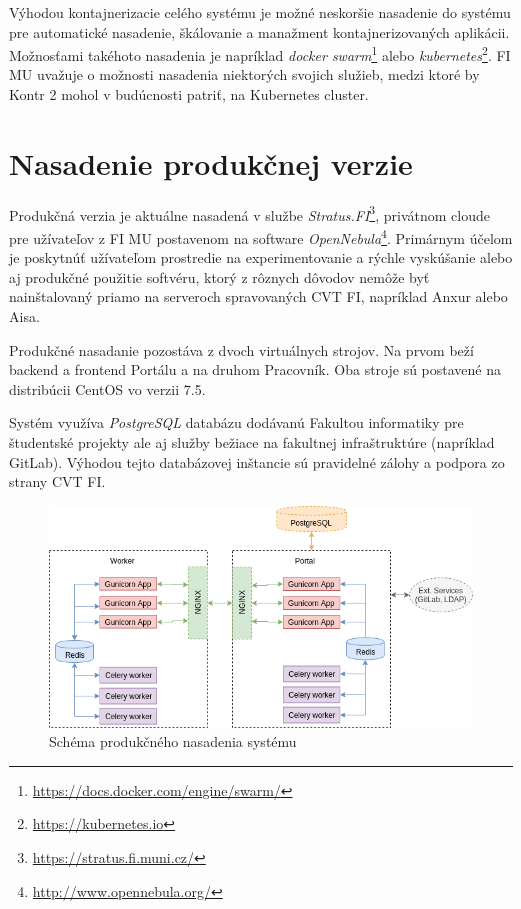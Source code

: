 \documentclass[
  digital, %
  oneside, %
  table,   %
  lof,     %
  lot,   %
]{fithesis3}
\begin{document}
Výhodou kontajnerizacie celého systému je možné neskoršie nasadenie do systému pre automatické nasadenie, škálovanie a manažment kontajnerizovaných aplikácii. Možnosťami takéhoto nasadenia je napríklad \emph{docker swarm}\footnote{\url{https://docs.docker.com/engine/swarm/}} alebo \emph{kubernetes}\footnote{\url{https://kubernetes.io}}. FI MU uvažuje o možnosti nasadenia niektorých svojich služieb, medzi ktoré by Kontr 2 mohol v budúcnosti patriť, na Kubernetes cluster. 

\section{Nasadenie produkčnej verzie}
\label{deploy-prod}

Produkčná verzia je aktuálne nasadená v službe \emph{Stratus.FI}\footnote{\url{https://stratus.fi.muni.cz/}}, privátnom cloude pre užívateľov z FI MU postavenom na software \emph{OpenNebula}\footnote{\url{http://www.opennebula.org/}}.
Primárnym účelom je poskytnúť užívateľom prostredie na experimentovanie a rýchle vyskúšanie alebo aj produkčné použitie softvéru, ktorý z rôznych dôvodov nemôže byť nainštalovaný priamo na serveroch spravovaných CVT FI, napríklad Anxur alebo Aisa\cite{fi-tech-stratus}.

Produkčné nasadanie pozostáva z dvoch virtuálnych strojov. Na prvom beží backend a frontend Portálu a na druhom Pracovník. Oba stroje sú postavené na distribúcii CentOS vo verzii 7.5.

Systém využíva \emph{PostgreSQL} databázu dodávanú Fakultou informatiky pre študentské projekty ale aj služby bežiace na fakultnej infraštruktúre (napríklad GitLab). Výhodou tejto databázovej inštancie sú pravidelné zálohy a podpora zo strany CVT FI.

\begin{figure}[!ht]
  \begin{center}
    \includegraphics[width=\textwidth]{imgs/sys-deploy.png}
  \end{center}
    \caption{Schéma produkčného nasadenia systému}
    \label{fig:prod-deploy}
\end{figure}
\end{document}

